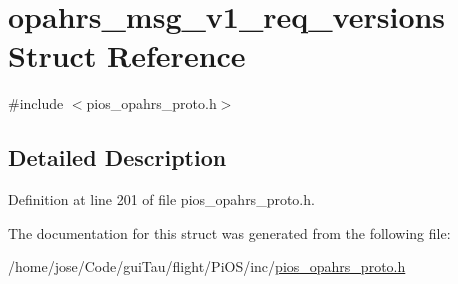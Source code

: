 \hypertarget{structopahrs__msg__v1__req__versions}{\section{opahrs\-\_\-msg\-\_\-v1\-\_\-req\-\_\-versions Struct Reference}
\label{structopahrs__msg__v1__req__versions}
}


{\ttfamily \#include $<$pios\-\_\-opahrs\-\_\-proto.\-h$>$}



\subsection{Detailed Description}


Definition at line 201 of file pios\-\_\-opahrs\-\_\-proto.\-h.



The documentation for this struct was generated from the following file\-:\begin{DoxyCompactItemize}
\item 
/home/jose/\-Code/gui\-Tau/flight/\-Pi\-O\-S/inc/\hyperlink{pios__opahrs__proto_8h}{pios\-\_\-opahrs\-\_\-proto.\-h}\end{DoxyCompactItemize}
